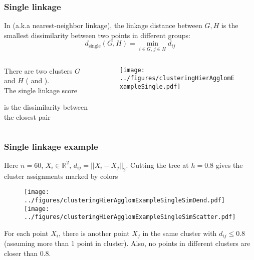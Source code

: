 \documentclass{beamer}
\begin{document}
\begin{frame}
\frametitle{Single linkage}
In  (a.k.a nearest-neighbor linkage), the linkage distance between $G,H$ is the smallest dissimilarity 
between two points in different groups:
\[
d_{\textrm{single}}(G,H) = \min_{i \in G, \, j \in H} d_{ij}
\]
\begin{columns}[T]
\begin{column}{.52\textwidth}
\vsp

 There are two clusters $G$ and $H$ ( and ).  \\ The single linkage
score 


is the dissimilarity between the closest pair 

\end{column}
\begin{column}{.48\textwidth}
\begin{figure}[h!]
  \centering
  \texttt{[image: ../figures/clusteringHierAgglomExampleSingle.pdf]}
\end{figure}
\end{column}
\end{columns}
\end{frame}

\begin{frame}
\frametitle{Single linkage example}
Here $n = 60$, $X_i \in \mathbb{R}^2$, $d_{ij} = || X_i - X_j||_2$.  Cutting the tree at $h = 0.8$ gives the cluster
assignments marked by colors
\begin{figure}[h!]
  \centering
  \texttt{[image: ../figures/clusteringHierAgglomExampleSingleSimDend.pdf]}
  \texttt{[image: ../figures/clusteringHierAgglomExampleSingleSimScatter.pdf]}  
\end{figure}
 For each point $X_i$, there is another point $X_j$ in the same cluster with $d_{ij} \leq 0.8$
(assuming more than 1 point in cluster).  Also, no points in different clusters are closer than 0.8.
\end{frame}
\end{document}
